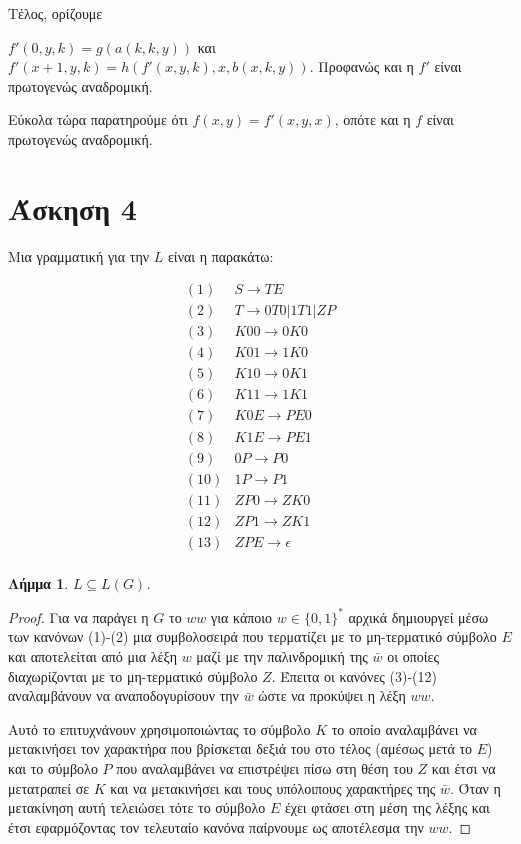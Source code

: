 \documentclass[a4paper, oneside, 11pt]{article}
\newtheorem{lm}[thm]{Λήμμα}
\theoremstyle{definition}
\begin{document}
Τέλος, ορίζουμε

$f'(0,y,k)=g(a(k,k,y))$ και $f'(x+1,y,k)=h(f'(x,y,k),x,b(x,k,y))$. Προφανώς και η $f'$ είναι πρωτογενώς αναδρομική.

Εύκολα τώρα παρατηρούμε ότι $f(x,y)=f'(x,y,x)$, οπότε και η $f$ είναι πρωτογενώς αναδρομική.

\section*{Άσκηση 4}
Μια γραμματική για την $L$ είναι η παρακάτω:

\begin{align*}
   (1)  &S     \rightarrow T E\\
   (2)  &T     \rightarrow 0 T 0 | 1 T 1 | Z P\\
   (3)  &K 0 0 \rightarrow 0 K 0\\
   (4)  &K 0 1 \rightarrow 1 K 0\\
   (5)  &K 1 0 \rightarrow 0 K 1\\
   (6)  &K 1 1 \rightarrow 1 K 1\\
   (7)  &K 0 E \rightarrow P E 0\\
   (8)  &K 1 E \rightarrow P E 1\\
   (9)  &0 P   \rightarrow P 0\\
   (10) &1 P   \rightarrow P 1\\
   (11) &Z P 0 \rightarrow Z K 0\\
   (12) &Z P 1 \rightarrow Z K 1\\
   (13) &Z P E \rightarrow \epsilon\\
\end{align*}

\begin{lm}
$L \subseteq L(G)$.
\end{lm}
\begin{proof}
Για να παράγει η $G$ το $ww$ για κάποιο $w \in \{0, 1\}^*$ αρχικά δημιουργεί
μέσω των κανόνων (1)-(2) μια συμβολοσειρά που τερματίζει με το μη-τερματικό
σύμβολο $E$ και αποτελείται από μια λέξη $w$ μαζί με την παλινδρομική της
$\bar{w}$ οι οποίες διαχωρίζονται με το μη-τερματικό σύμβολο $Z$. Έπειτα οι
κανόνες (3)-(12) αναλαμβάνουν να αναποδογυρίσουν την $\bar{w}$ ώστε να προκύψει
η λέξη $ww$.

Αυτό το επιτυχνάνουν χρησιμοποιώντας το σύμβολο $K$ το οποίο αναλαμβάνει να
μετακινήσει τον χαρακτήρα που βρίσκεται δεξιά του στο τέλος (αμέσως μετά το $E$)
και το σύμβολο $P$ που αναλαμβάνει να επιστρέψει πίσω στη θέση του $Z$ και έτσι
να μετατραπεί σε $K$ και να μετακινήσει και τους υπόλοιπους χαρακτήρες της
$\bar{w}$. Όταν η μετακίνηση αυτή τελειώσει τότε το σύμβολο $E$ έχει φτάσει στη
μέση της λέξης και έτσι εφαρμόζοντας τον τελευταίο κανόνα παίρνουμε ως
αποτέλεσμα την $ww$.
\end{proof}
\end{document}
